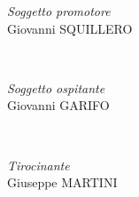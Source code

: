 \documentclass[../main.tex]{subfiles}
\begin{document}
\begin{titlepage}
        \begin{minipage}{0.3\textwidth}
            \begin{flushleft}
                \large
                \textit{Soggetto promotore}\\
                Giovanni \textsc{SQUILLERO}
            \end{flushleft}
        \end{minipage}
        ~
        \begin{minipage}{0.3\textwidth}
            \begin{center}
                \large
                \textit{Soggetto ospitante}\\
                Giovanni \textsc{GARIFO}
            \end{center}
        \end{minipage}
        ~
        \begin{minipage}{0.3\textwidth}
            \begin{flushright}
                \large
                \textit{Tirocinante}\\
                Giuseppe \textsc{MARTINI}
            \end{flushright}
        \end{minipage}
    \end{titlepage}
\end{document}
